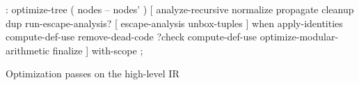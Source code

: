 \centering

  \begin{factorcode}
    : optimize-tree ( nodes -- nodes' )
      [
          analyze-recursive
          normalize
          propagate
          cleanup
          dup run-escape-analysis? [
              escape-analysis
              unbox-tuples
          ] when
          apply-identities
          compute-def-use
          remove-dead-code
          ?check
          compute-def-use
          optimize-modular-arithmetic
          finalize
      ] with-scope ;
  \end{factorcode}

\caption{Optimization passes on the high-level IR}

